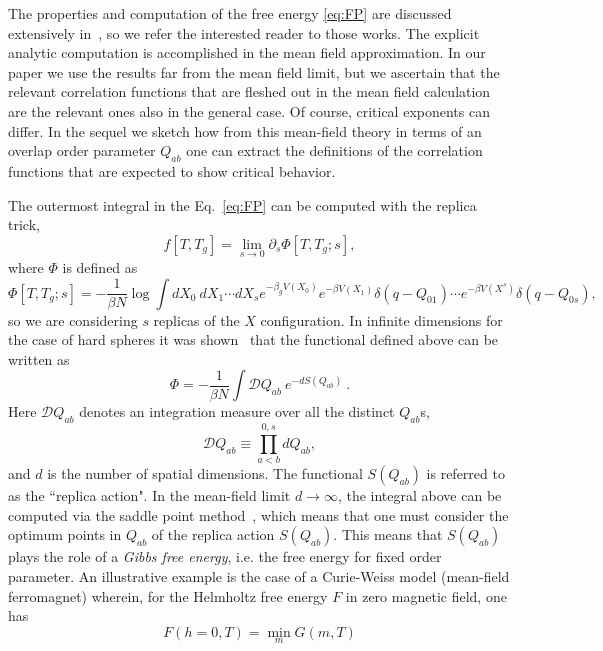 \documentclass[aps,pnas,float]{revtex4}
\begin{document}
The properties and computation of the free energy \eqref{eq:FP} are discussed extensively in~\cite{RUYZ15,RU16}, so we refer the interested reader to those works. The explicit analytic computation is accomplished in the
mean field approximation. In our paper we use the results far from the mean field limit, but we ascertain that the relevant correlation functions that are fleshed out in the mean field calculation are the relevant ones also in the general case. Of course, critical exponents can differ. In the sequel we sketch how from this mean-field theory in terms of an overlap order parameter $Q_{ab}$ one can extract the definitions of the correlation functions that are expected to show critical behavior.

The outermost integral in the Eq.~\eqref{eq:FP} can be computed with the replica trick,
\begin{equation}
 f[T,T_g] = \lim_{s\to 0} \partial_s \Phi[T,T_g;s],
\end{equation}
where $\Phi$ is defined as
\begin{equation}
 \Phi[T,T_g;s] =  -\frac{1}{\beta N}\log \int dX_0\ dX_1 \cdots dX_s e^{-\beta_g V(X_0)} e^{- \beta V(X_1)}\delta(q-Q_{01})\cdots e^{- \beta V(X^s)}\delta(q-Q_{0s}),
\end{equation}
so we are considering $s$ replicas of the $X$ configuration. In infinite dimensions for the case of hard spheres it was shown~\cite{KPZ12} that the functional defined above can be written as
\begin{equation}
 \Phi = -\frac{1}{\beta N} \int \mathcal{D} Q_{ab}\ e^{-d S(Q_{ab})} \ .
\end{equation}
Here $\mathcal{D}Q_{ab}$ denotes an integration measure over all the distinct $Q_{ab}$s,
\begin{equation}
 \mathcal{D}Q_{ab} \equiv \prod_{a<b}^{0,s} dQ_{ab},
\end{equation}
and $d$ is the number of spatial dimensions. The functional $S(Q_{ab})$ is referred to as the ``replica action". In the mean-field limit $d\to\infty$, the integral above can be computed via the saddle point method~\cite{BenderAdvancedMethods}, which means that one must consider the optimum points in $Q_{ab}$ of the replica action $S(Q_{ab})$. This means that $S(Q_{ab})$ plays the role of a \emph{Gibbs free energy}, i.e. the free energy for fixed order parameter. An illustrative example is the case of a Curie-Weiss model (mean-field ferromagnet) wherein, for the Helmholtz free energy $F$ in zero magnetic field, one has~\cite{replicanotes}
\begin{equation}
 F(h=0,T) = \min_{m}G(m,T)
\end{equation}
\end{document}
